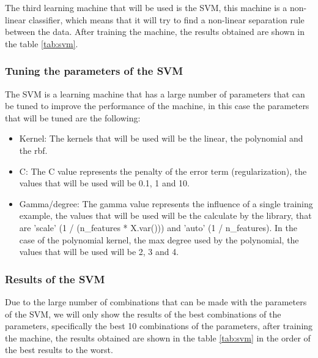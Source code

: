 \documentclass{article}
\theoremstyle{mytheoremstyle}
\theoremstyle{mytheoremstyle}
\theoremstyle{myproblemstyle}
\begin{document}
The third learning machine that will be used is the SVM, this machine is a non-linear classifier, which means that it will try to find a non-linear separation rule between the data. After training the machine, the results obtained are shown in the table \ref{tab:svm}.

\subsubsection*{Tuning the parameters of the SVM}

The SVM is a learning machine that has a large number of parameters that can be tuned to improve the performance of the machine, in this case the parameters that will be tuned are the following:

\begin{itemize}
  \item Kernel: The kernels that will be used will be the linear, the polynomial and the rbf.
  \item C: The C value represents the penalty of the error term (regularization), the values that will be used will be 0.1, 1 and 10.
  \item Gamma/degree: The gamma value represents the influence of a single training example, the values that will be used will be the calculate by the library, that are 'scale' (1 / (n\_features * X.var())) and 'auto' (1 / n\_features). In the case of the polynomial kernel, the max degree used by the polynomial, the values that will be used will be 2, 3 and 4.
\end{itemize}

\subsubsection*{Results of the SVM}

Due to the large number of combinations that can be made with the parameters of the SVM, we will only show the results of the best combinations of the parameters, specifically the best 10 combinations of the parameters, after training the machine, the results obtained are shown in the table \ref{tab:svm} in the order of the best results to the worst.
\end{document}
